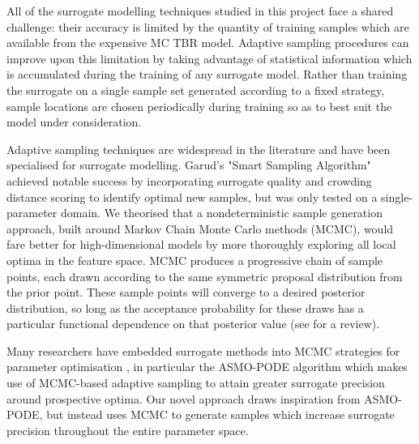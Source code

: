 All of the surrogate modelling techniques studied in this project face a shared
challenge: their accuracy is limited by the quantity of training samples which
are available from the expensive MC TBR model. Adaptive sampling procedures can
improve upon this limitation by taking advantage of statistical information
which is accumulated during the training of any surrogate model. Rather than
training the surrogate on a single sample set generated according to a fixed
strategy, sample locations are chosen periodically during training so as to best suit the model
under consideration.

Adaptive sampling techniques are widespread in the literature and have been
specialised for surrogate modelling. Garud's \cite{Garud2016} "Smart Sampling
Algorithm" achieved notable success by incorporating surrogate quality and
crowding distance scoring to identify optimal new samples, but was only tested
on a single-parameter domain. We theorised that a nondeterministic sample
generation approach, built around Markov Chain Monte Carlo methods (MCMC), would
fare better for high-dimensional models by more thoroughly exploring all local
optima in the feature space. MCMC produces a progressive chain of sample points,
each drawn according to the same symmetric proposal distribution
from the prior point. These sample points will converge to a desired posterior
distribution, so long as the acceptance probability for these draws has a
particular functional dependence on that posterior value (see \cite{Zhou2018}
for a review).


Many researchers have embedded surrogate methods into MCMC strategies for
parameter optimisation \cite{Zhang2020,Gong2017}, in particular the ASMO-PODE
algorithm \cite{Ginting2011} which makes use of MCMC-based adaptive sampling to
attain greater surrogate precision around prospective optima. Our novel approach
draws inspiration from ASMO-PODE, but instead uses MCMC to generate samples
which increase surrogate precision throughout the entire parameter space.

